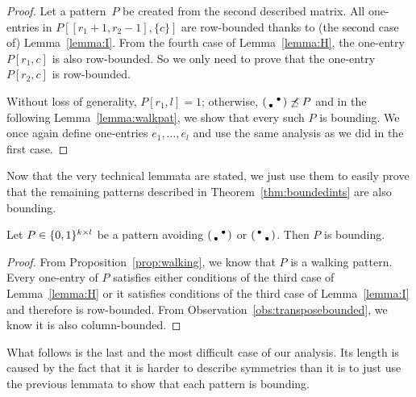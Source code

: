 \begin{proof}
Let a pattern~$P$ be created from the second described matrix. All one-entries in $P[[r_1+1,r_2-1],\{c\}]$ are row-bounded thanks to (the second case of) Lemma~\ref{lemma:I}. From the fourth case of Lemma~\ref{lemma:H}, the one-entry~$P[r_1,c]$ is also row-bounded. So we only need to prove that the one-entry~$P[r_2,c]$ is row-bounded.

Without loss of generality, $P[r_1,l]=1$; otherwise, $\left(\begin{smallmatrix} &\bullet\\\bullet& \end{smallmatrix}\right)\not\preceq P$ and in the following Lemma~\ref{lemma:walkpat}, we show that every such $P$ is bounding. We once again define one-entries $e_1,\dots,e_l$ and use the same analysis as we did in the first case.
\end{proof}

Now that the very technical lemmata are stated, we just use them to easily prove that the remaining patterns described in Theorem~\ref{thm:boundedints} are also bounding.

\begin{lemma}
\label{lemma:walkpat}
Let $P\in\{0,1\}^{k\times l}$ be a pattern avoiding $\left(\begin{smallmatrix} &\bullet\\\bullet& \end{smallmatrix}\right)$ or $\left(\begin{smallmatrix}\bullet& \\ &\bullet\end{smallmatrix}\right)$. Then $P$ is bounding.
\end{lemma}
\begin{proof}
From Proposition~\ref{prop:walking}, we know that $P$ is a walking pattern. Every one-entry of $P$ satisfies either conditions of the third case of Lemma~\ref{lemma:H} or it satisfies conditions of the third case of Lemma~\ref{lemma:I} and therefore is row-bounded. From Observation~\ref{obs:transposebounded}, we know it is also column-bounded.
\end{proof}

What follows is the last and the most difficult case of our analysis. Its length is caused by the fact that it is harder to describe symmetries than it is to just use the previous lemmata to show that each pattern is bounding.

